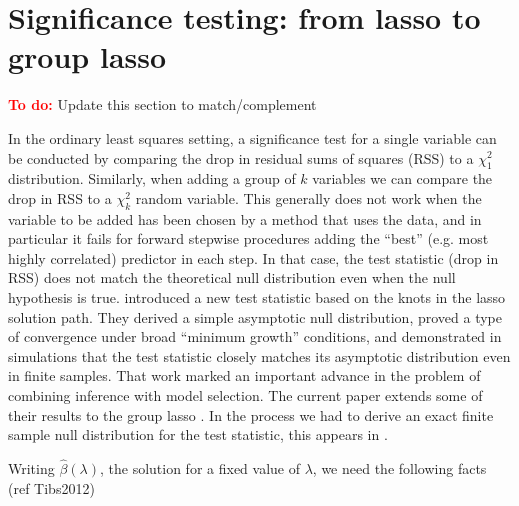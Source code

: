 \documentclass{imsart}
\newcommand{\todo}{\textcolor{red}{\textbf{To do: }}}
\begin{document}

\section{Significance testing: from lasso to group lasso}
\label{sec:testing}

\todo Update this section to match/complement \citep{tests:adaptive}



In the ordinary least squares setting, a significance test for a
single variable can be conducted by comparing the drop in residual
sums of squares (RSS) to a $\chi^2_1$ distribution. Similarly, when
adding a group of $k$ variables we can compare the drop in RSS to a
$\chi^2_k$ random variable. This generally does not work when the
variable to be added has been chosen by a method that uses the data,
and in particular it fails for forward stepwise procedures adding
the ``best'' (e.g. most highly correlated) predictor in each step. In
that case, the test statistic (drop in RSS) does not match the
theoretical null distribution even when the null hypothesis is
true. \cite{significance:lasso} introduced a new test statistic based
on the knots in the lasso solution path. They derived a simple
asymptotic null distribution, proved a type of convergence under broad
``minimum growth'' conditions, and demonstrated in simulations that
the test statistic closely matches its asymptotic distribution even in
finite samples.  That work marked an important advance in the problem
of combining inference with model selection.  The current paper
extends some of their results to the group lasso \citep{grouplasso}.
In the process we had to derive an exact finite sample null
distribution for the test statistic, this appears in
\cite{tests:adaptive}. 


Writing $\hat
\beta(\lambda)$, the solution for a fixed value of $\lambda$, we need
the following facts (ref Tibs2012) 
\end{document}
